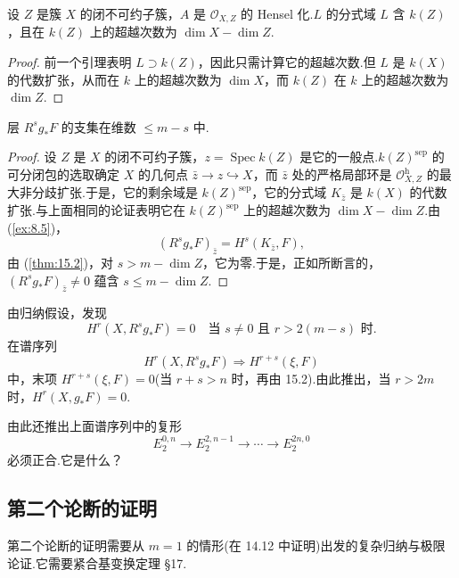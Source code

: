 \begin{lemma}\label{lem:15.4}
设 $Z$ 是簇 $X$ 的闭不可约子簇，$A$ 是 $\mathcal{O}_{X, Z}$ 的 Hensel 化.$L$ 的分式域 $L$ 含 $k(Z)$，且在 $k(Z)$ 上的超越次数为 $\dim X - \dim Z$.
\end{lemma}

\begin{proof}
前一个引理表明 $L \supset k(Z)$，因此只需计算它的超越次数.但 $L$ 是 $k(X)$ 的代数扩张，从而在 $k$ 上的超越次数为 $\dim X$，而 $k(Z)$ 在 $k$ 上的超越次数为 $\dim Z$.
\end{proof}

\begin{lemma}\label{lem:15.5}
层 $R^{s}g_{*}F$ 的支集在维数 $\leq m - s$ 中.
\end{lemma}

\begin{proof}
设 $Z$ 是 $X$ 的闭不可约子簇，$z = \operatorname{Spec} k(Z)$ 是它的一般点.$k(Z)^{\mathrm{sep}}$ 的可分闭包的选取确定 $X$ 的几何点 $\bar{z} \to z \hookrightarrow X$，而 $\bar{z}$ 处的严格局部环是 $\mathcal{O}^{\mathrm{h}}_{X, Z}$ 的最大非分歧扩张.于是，它的剩余域是 $k(Z)^{\mathrm{sep}}$，它的分式域 $K_{\bar{z}}$ 是 $k(X)$ 的代数扩张.与上面相同的论证表明它在 $k(Z)^{\mathrm{sep}}$ 上的超越次数为 $\dim X - \dim Z$.由 (\ref{ex:8.5})，
\[
(R^{s}g_{*}F)_{\bar{z}} = H^{s}(K_{\bar{z}}, F),
\]
由 (\ref{thm:15.2})，对 $s > m - \dim Z$，它为零.于是，正如所断言的，$(R^{s}g_{*}F)_{\bar{z}} \neq 0$ 蕴含 $s \leq m - \dim Z$.
\end{proof}

由归纳假设，发现
\[
H^{r}(X, R^{s}g_{*}F) = 0 \quad \text{当 } s \neq 0 \text{ 且 } r > 2(m - s) \text{ 时}.
\]
在谱序列
\[
H^{r}(X, R^{s}g_{*}F) \Rightarrow H^{r+s}(\xi, F)
\]
中，末项 $H^{r+s}(\xi, F) = 0$(当 $r + s > n$ 时，再由 15.2).由此推出，当 $r > 2m$ 时，$H^{r}(X, g_{*}F) = 0$.

\begin{question}\label{question:15.6}
由此还推出上面谱序列中的复形
\[
E^{0, n}_2 \to E^{2, n-1}_2 \to \cdots \to E^{2n, 0}_2
\]
必须正合.它是什么？
\end{question}

\subsection*{第二个论断的证明}

第二个论断的证明需要从 $m = 1$ 的情形(在 14.12 中证明)出发的复杂归纳与极限论证.它需要紧合基变换定理 \S 17.
